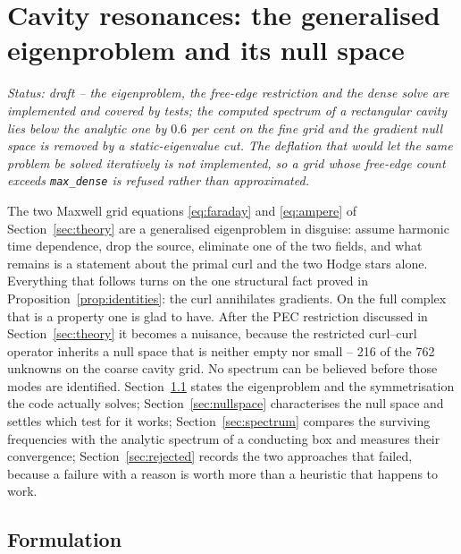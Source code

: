 \section{Cavity resonances: the generalised eigenproblem and its null space} \label{sec:eigen}

\noindent\emph{Status: draft -- the eigenproblem, the free-edge restriction and the dense solve are
implemented and covered by tests; the computed spectrum of a rectangular cavity lies below the
analytic one by $0.6$ per cent on the fine grid and the gradient null space is removed by a
static-eigenvalue cut. The deflation that would let the same problem be solved iteratively is not
implemented, so a grid whose free-edge count exceeds \texttt{max\_dense} is refused rather than
approximated.}

The two Maxwell grid equations \eqref{eq:faraday} and \eqref{eq:ampere} of Section~\ref{sec:theory}
are a generalised eigenproblem in disguise: assume harmonic time dependence, drop the source,
eliminate one of the two fields, and what remains is a statement about the primal curl and the two
Hodge stars alone. Everything that follows turns on the one structural fact proved in
Proposition~\ref{prop:identities}: the curl annihilates gradients. On the full complex that is a
property one is glad to have. After the PEC restriction discussed in Section~\ref{sec:theory} it
becomes a nuisance, because the restricted curl--curl operator inherits a null space that is neither
empty nor small -- 216 of the 762 unknowns on the coarse cavity grid. No spectrum can be believed
before those modes are identified. Section~\ref{sec:formulation} states the eigenproblem and the
symmetrisation the code actually solves; Section~\ref{sec:nullspace} characterises the null space
and settles which test for it works; Section~\ref{sec:spectrum} compares the surviving frequencies
with the analytic spectrum of a conducting box and measures their convergence;
Section~\ref{sec:rejected} records the two approaches that failed, because a failure with a reason
is worth more than a heuristic that happens to work.

\subsection{Formulation} \label{sec:formulation}

